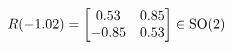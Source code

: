 \documentclass[preview]{standalone}
\begin{document}
\begin{align*}
\special{dvisvgm:raw <g id='unique000'>}R(-1.02) = \begin{bmatrix} 0.53 & 0.85 \\ -0.85 & 0.53 \end{bmatrix} \in \text{SO}(2)\special{dvisvgm:raw </g>}
\end{align*}
\end{document}
